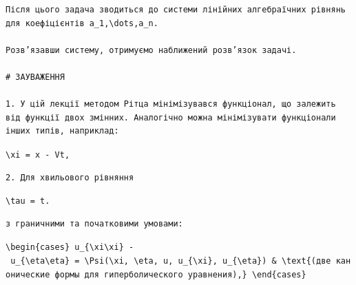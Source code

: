 \documentclass[
  ukrainian,
]{article}
\begin{document}
\begin{verbatim}
Після цього задача зводиться до системи лінійних алгебраїчних рівнянь для коефіцієнтів a_1,\dots,a_n.

Розв’язавши систему, отримуємо наближений розв’язок задачі.

# ЗАУВАЖЕННЯ

1. У цій лекції методом Рітца мінімізувався функціонал, що залежить від функції двох змінних. Аналогічно можна мінімізувати функціонали інших типів, наприклад:
\end{verbatim}

\texttt{\textbackslash{}xi\ =\ x\ -\ Vt,}

\begin{verbatim}
2. Для хвильового рівняння
\end{verbatim}

\texttt{\textbackslash{}tau\ =\ t.}

\begin{verbatim}
з граничними та початковими умовами:
\end{verbatim}

\texttt{\textbackslash{}begin\{cases\}\ u\_\{\textbackslash{}xi\textbackslash{}xi\}\ -\ u\_\{\textbackslash{}eta\textbackslash{}eta\}\ =\ \textbackslash{}Psi(\textbackslash{}xi,\ \textbackslash{}eta,\ u,\ u\_\{\textbackslash{}xi\},\ u\_\{\textbackslash{}eta\})\ \&\ \textbackslash{}text\{(две\ канонические\ формы\ для\ гиперболического\ уравнения),\}\ \textbackslash{}end\{cases\}}
\end{document}
